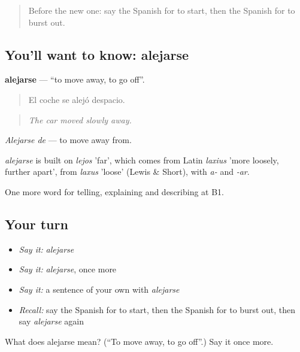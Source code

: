 \label{lesson:ES-C562-alejarse}



\begin{quote}
Before the new one: say the Spanish for to start, then the Spanish for to burst out.
\end{quote}

\subsection*{You'll want to know: alejarse}
\textbf{alejarse} — \textquotedblleft{}to move away, to go off\textquotedblright{}.

\begin{quote}
El coche se alejó despacio.
\end{quote}

\begin{quote}
\emph{The car moved slowly away.}
\end{quote}

\emph{Alejarse de} — to move away from.

\begin{cousinweb}
\emph{alejarse} is built on \emph{lejos} 'far', which comes from Latin \emph{laxius} 'more loosely, further apart', from \emph{laxus} 'loose' (Lewis \& Short), with \emph{a-} and \emph{-ar}.
\end{cousinweb}

\begin{grammarlens}[title={What you've built}]
One more word for telling, explaining and describing at B1.
\end{grammarlens}

\subsection*{Your turn}
\begin{itemize}
\raggedright
  \item \emph{Say it:} \emph{alejarse}
  \item \emph{Say it:} \emph{alejarse}, once more
  \item \emph{Say it:} a sentence of your own with \emph{alejarse}
  \item \emph{Recall:} say the Spanish for to start, then the Spanish for to burst out, then say \emph{alejarse} again
\end{itemize}

\begin{tcolorbox}[breakable,colback=teal!4,colframe=teal!35!black,title={Before you move on}]
What does alejarse mean? (\textquotedblleft{}To move away, to go off\textquotedblright{}.) Say it once more.
\end{tcolorbox}
